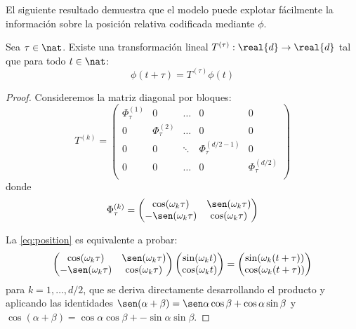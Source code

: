 El siguiente resultado demuestra que el modelo puede explotar fácilmente la información sobre la posición relativa codificada mediante \( \phi \).
\begin{proposition}
Sea \( \tau \in \nat \). Existe una transformación lineal \( T^{(\tau)} : \real{d} \to \real{d} \) tal que para todo \( t \in \nat \):
\begin{equation} \label{eq:position}
    \phi(t + \tau) = T^{(\tau)} \phi(t) 
\end{equation}
\end{proposition}

\begin{proof}
Consideremos la matriz diagonal por bloques:
\[
    T^{(k)} = \begin{pmatrix} 
    \Phi_\tau^{(1)} & 0 & \dots & 0 & 0 \\
    0 & \Phi_\tau^{(2)} & \dots & 0 & 0 \\
    0 & 0 & \ddots & \Phi_\tau^{(d/2 - 1)} & 0 \\
    0 & 0 & \dots & 0 & \Phi_\tau^{(d/2)} \\
    \end{pmatrix}
\]
donde \[ 
    \Phi^{(k)}_{\tau} = \begin{pmatrix}
        \cos(\omega_k \tau) & \sen(\omega_k \tau) \\
        -\sen(\omega_k \tau) & \cos(\omega_k \tau)
    \end{pmatrix}
\]

La \cref{eq:position} es equivalente a probar:
\[
    \begin{pmatrix}
        \cos(\omega_k \tau) & \sen(\omega_k \tau) \\
        -\sen(\omega_k \tau) & \cos(\omega_k \tau)
    \end{pmatrix} \begin{pmatrix}
        \sin(\omega_k t) \\ 
        \cos(\omega_k t)
    \end{pmatrix} = \begin{pmatrix}
        \sin(\omega_k (t + \tau)) \\ 
        \cos(\omega_k (t + \tau))
    \end{pmatrix}
\]
para \( k = 1, \dots, d/2\), que se deriva directamente desarrollando el producto y aplicando las identidades \( \sen(\alpha + \beta) = \sen\alpha \cos\beta + \cos\alpha \sin\beta \) y \( \cos(\alpha + \beta) = \cos\alpha \cos\beta + - \sin\alpha \sin\beta \).
\end{proof}

